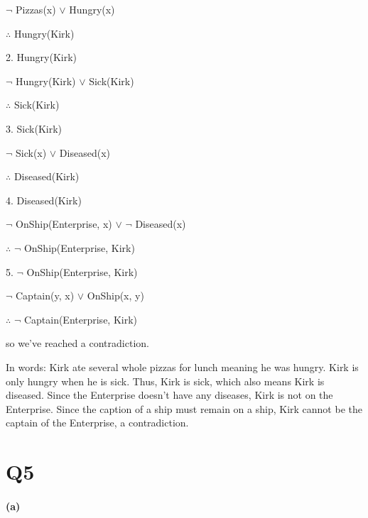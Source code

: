 \documentclass[11pt,a4paper]{article}
\begin{document}
$\neg$ Pizzas(x) $\vee$ Hungry(x)

$\therefore$ Hungry(Kirk)
\newline

2. Hungry(Kirk)

$\neg$ Hungry(Kirk) $\vee$ Sick(Kirk)

$\therefore$ Sick(Kirk)
\newline

3. Sick(Kirk)

$\neg$ Sick(x) $\vee$ Diseased(x)

$\therefore$ Diseased(Kirk)
\newline

4. Diseased(Kirk)

$\neg$ OnShip(Enterprise, x) $\vee$ $\neg$ Diseased(x)

$\therefore$ $\neg$ OnShip(Enterprise, Kirk)
\newline

5. $\neg$ OnShip(Enterprise, Kirk)

$\neg$ Captain(y, x) $\vee$ OnShip(x, y) 

$\therefore$ $\neg$ Captain(Enterprise, Kirk)

so we've reached a contradiction.

In words: Kirk ate several whole pizzas for lunch meaning he was hungry. Kirk is only hungry when he is sick. Thus, Kirk is sick, which also means Kirk is diseased. Since the Enterprise doesn't have any diseases, Kirk is not on the Enterprise. Since the caption of a ship must remain on a ship, Kirk cannot be the captain of the Enterprise, a contradiction.

\section*{Q5}

\paragraph*{(a)}

\begin{center}
\end{center}
\end{document}
